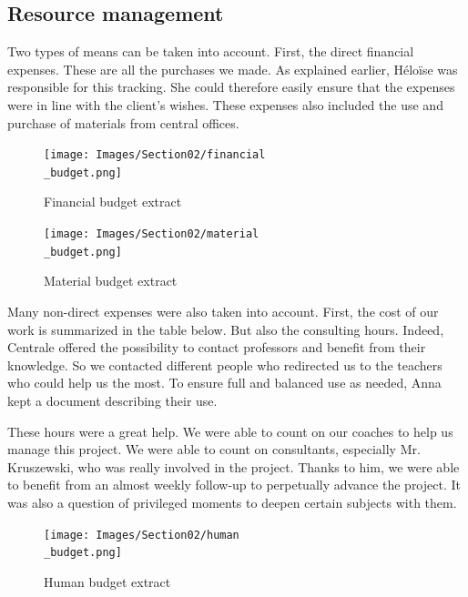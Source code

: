 \subsection{Resource management}

Two types of means can be taken into account. First, the direct financial expenses. These are all the purchases we made. As explained earlier, Héloïse was responsible for this tracking. She could therefore easily ensure that the expenses were in line with the client's wishes. These expenses also included the use and purchase of materials from central offices. 

\begin{figure}[ht]
    \centering
    \texttt{[image: Images/Section02/financial\\\_budget.png]}
    \caption{Financial budget extract}
    \label{fig:financialBudgetextract}
\end{figure}
\FloatBarrier

\begin{figure}[ht]
    \centering
    \texttt{[image: Images/Section02/material\\\_budget.png]}
    \caption{Material budget extract}
    \label{fig:materialBudgetextract}
\end{figure}
\FloatBarrier
Many non-direct expenses were also taken into account. First, the cost of our work is summarized in the table below. But also the consulting hours. Indeed, Centrale offered the possibility to contact professors and benefit from their knowledge. So we contacted different people who redirected us to the teachers who could help us the most. To ensure full and balanced use as needed, Anna kept a document describing their use. 

\bigbreak
These hours were a great help. We were able to count on our coaches to help us manage this project. We were able to count on consultants, especially Mr. Kruszewski, who was really involved in the project. Thanks to him, we were able to benefit from an almost weekly follow-up to perpetually advance the project. It was also a question of privileged moments to deepen certain subjects with them.

\begin{figure}[ht]
    \centering
    \texttt{[image: Images/Section02/human\\\_budget.png]}
    \caption{Human budget extract}
    \label{fig:humanBudget}
\end{figure}